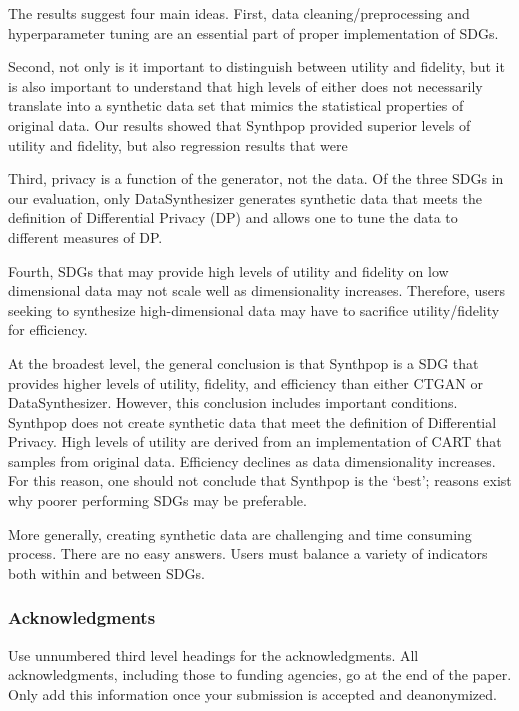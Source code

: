 \documentclass[runningheads]{llncs}
\begin{document}
The results suggest four main ideas.  First, data cleaning/preprocessing and hyperparameter tuning are an essential part of proper implementation of SDGs.   

Second, not only is it important to distinguish between utility and fidelity, but it is also important to understand that high levels of either does not necessarily translate into a synthetic data set that mimics the statistical properties of original data.  Our results showed that Synthpop provided superior levels of utility and fidelity, but also regression results that were 

Third, privacy is a function of the generator, not the data.  Of the three SDGs in our evaluation, only DataSynthesizer generates synthetic data that meets the definition of Differential Privacy (DP) and allows one to tune the data to different measures of DP.

Fourth, SDGs that may provide high levels of utility and fidelity on low dimensional data may not scale well as dimensionality increases.  Therefore, users seeking to synthesize high-dimensional data may have to sacrifice utility/fidelity for efficiency.

At the broadest level, the general conclusion is that Synthpop is a SDG that provides higher levels of utility, fidelity, and efficiency than either CTGAN or DataSynthesizer.  However, this conclusion includes important conditions.  Synthpop does not create synthetic data that meet the definition of Differential Privacy.  High levels of utility are derived from an implementation of CART that samples from original data.  Efficiency declines as data dimensionality increases.  For this reason, one should not conclude that Synthpop is the `best'; reasons exist why poorer performing SDGs may be preferable.

More generally, creating synthetic data are challenging and time consuming process.  There are no easy answers.  Users must balance a variety of indicators both within and between SDGs.  



\subsubsection*{Acknowledgments}
Use unnumbered third level headings for the acknowledgments. All acknowledgments, including those to funding agencies, go at the end of the paper. Only add this information once your submission is accepted and deanonymized. 

\clearpage


\clearpage


\clearpage



\clearpage
\appendix


\clearpage

\end{document}
